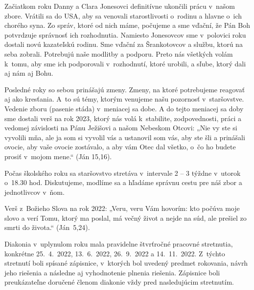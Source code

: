 Začiatkom roku Danny a Clara Jonesovci definitívne ukončili prácu v~našom zbore. Vrátili sa do USA, aby sa venovali starostlivosti o~rodinu a hlavne o~ich chorého syna. Zo správ, ktoré od nich máme, počujeme a sme vďační, že Pán Boh potvrdzuje správnosť ich rozhodnutia.
Namiesto Jonesovcov sme v~polovici roku dostali novú kazateľskú rodinu. Sme vďační za Šrankotovcov a službu, ktorú na seba zobrali. Potrebujú naše modlitby a podporu. Preto nás všetkých volám k~tomu, aby sme ich podporovali v~rozhodnutí, ktoré urobili, a sľube, ktorý dali aj nám aj Bohu.

Posledné roky so sebou prinášajú zmeny. Zmeny, na ktoré potrebujeme reagovať aj ako kresťania. A~to sú témy, ktorým venujeme našu pozornosť v~staršovstve. Vedenie zboru (pasenie stáda) v~meniacej sa dobe.
A do tejto meniacej sa doby sme dostali verš na rok 2023, ktorý nás volá k~stabilite, zodpovednosti, práci a vedomej závislosti na Pánu Ježišovi a našom Nebeskom Otcovi: „Nie vy ste si vyvolili mňa, ale ja som si vyvolil vás a ustanovil som vás, aby ste šli a prinášali ovocie, aby vaše ovocie zostávalo, a aby vám Otec dal všetko, o~čo ho budete prosiť v~mojom mene.“ (Ján 15,16).

Počas školského roku sa staršovstvo stretáva v~intervale 2 -- 3 týždne v~utorok o~18.30 hod. Diskutujeme, modlíme sa a hľadáme správnu cestu pre náš zbor a jednotlivcov v~ňom.




Verš z~Božieho Slova na rok 2022: „Veru, veru Vám hovorím: kto počúva moje slovo a verí Tomu, ktorý ma poslal, má večný život a nejde na súd, ale prešiel zo smrti do života.“ (Ján~5,24).

Diakonia v~uplynulom roku mala pravidelne štvrťročné pracovné stretnutia, konkrétne 25.~4.~2022, 13.~6.~2022, 26.~9.~2022 a 14.~11.~2022. Z~týchto stretnutí boli spísané zápisnice, v~ktorých bol uvedený predmet rokovania, návrh jeho riešenia a následne aj vyhodnotenie plnenia riešenia. Zápisnice boli preukázateľne doručené členom diakonie vždy pred nasledujúcim stretnutím.

